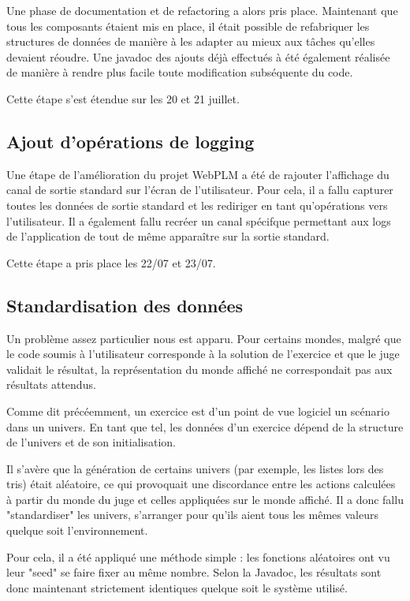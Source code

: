 \documentclass[stage]{tnreport}
\begin{document}
Une phase de documentation et de refactoring a alors pris place. Maintenant que tous les composants étaient mis en place, il était possible de refabriquer les structures de données de manière à les adapter au mieux aux tâches qu'elles devaient réoudre.
Une javadoc des ajouts déjà effectués à été également réalisée de manière à rendre plus facile toute modification subséquente du code.

Cette étape s'est étendue sur les 20 et 21 juillet.

\subsection{Ajout d'opérations de logging}

Une étape de l'amélioration du projet WebPLM a été de rajouter l'affichage du canal de sortie standard sur l'écran de l'utilisateur. Pour cela, il a fallu capturer toutes les données de sortie standard et les rediriger en tant qu'opérations vers l'utilisateur. Il a également fallu recréer un canal spécifque permettant aux logs de l'application de tout de même apparaître sur la sortie standard.

Cette étape a pris place les 22/07 et 23/07.

\subsection{Standardisation des données}

Un problème assez particulier nous est apparu. Pour certains mondes, malgré que le code soumis à l'utilisateur corresponde à la solution de l'exercice et que le juge validait le résultat, la représentation du monde affiché ne correspondait pas aux résultats attendus.

Comme dit précéemment, un exercice est d'un point de vue logiciel un scénario dans un univers. En tant que tel, les données d'un exercice dépend de la structure de l'univers et de son initialisation.

Il s'avère que la génération de certains univers (par exemple, les listes lors des tris) était aléatoire, ce qui provoquait une discordance entre les actions calculées à partir du monde du juge et celles appliquées sur le monde affiché. Il a donc fallu "standardiser" les univers, s'arranger pour qu'ils aient tous les mêmes valeurs quelque soit l'environnement.

Pour cela, il a été appliqué une méthode simple : les fonctions aléatoires ont vu leur "seed" se faire fixer au même nombre. Selon la Javadoc, les résultats sont donc maintenant strictement identiques quelque soit le système utilisé.
\end{document}
